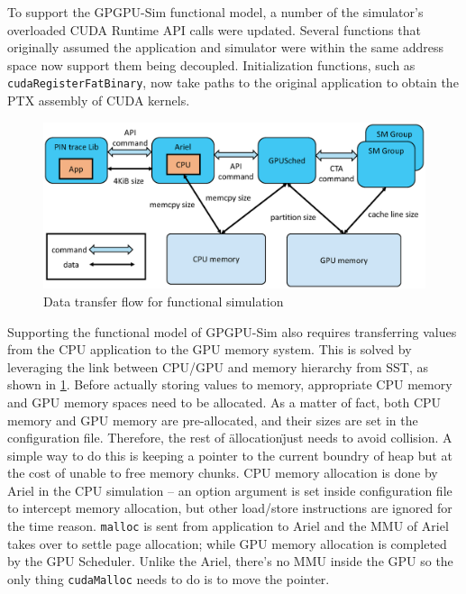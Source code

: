 To support the GPGPU-Sim functional model, a number of the simulator's overloaded
CUDA Runtime API calls were updated. Several functions that originally assumed
the application and simulator were within the same address space now support them being
decoupled. Initialization functions, such as \texttt{\textunderscore \textunderscore
cudaRegisterFatBinary}, now take paths to the original application to obtain the PTX
assembly of CUDA kernels.


   \begin{figure}[!htb]
      \centering
      \setlength{\abovecaptionskip}{6pt plus 1pt minus 1pt}
      \includegraphics[width=.90\textwidth,keepaspectratio]{figures/transfer_flow.eps}
      \captionsetup{width=.75\textwidth}
      \caption{Data transfer flow for functional simulation}
      \label{fig:gpu_transfer_model}
   \end{figure}

Supporting the functional model of GPGPU-Sim also requires transferring values
from the CPU application to the GPU memory system. This is solved by leveraging
the link between CPU/GPU and memory hierarchy from SST, as shown in
\ref{fig:gpu_transfer_model}. Before actually storing values to memory, appropriate 
CPU memory and GPU memory spaces need to be allocated. As a matter of fact, both CPU memory 
and GPU memory are pre-allocated, and their sizes are set in the configuration file. 
Therefore, the rest of \"allocation\" just needs to avoid collision. A simple way to do this is
keeping a pointer to the current boundry of heap but at the cost of unable to free memory chunks. 
CPU memory allocation is done by Ariel in the CPU simulation -- an option argument is set inside 
configuration file to intercept memory allocation, but other load/store instructions are ignored for 
the time reason. \texttt{malloc} is sent from application to Ariel and the MMU of Ariel takes 
over to settle page allocation; while GPU memory allocation is completed by the 
GPU Scheduler. Unlike the Ariel, there's no MMU inside the GPU so the only thing \texttt{cudaMalloc} 
needs to do is to move the pointer.

